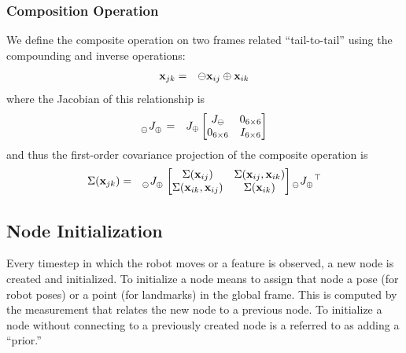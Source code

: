 \documentclass[conference]{IEEEtran}
\begin{document}
\subsubsection{Composition Operation}
\label{sub:compositionoperation}
We define the composite operation on two frames related
``tail-to-tail'' using the compounding and inverse operations:
\begin{eqnarray*}
  {\bf x}_{jk} & = & \ominus {\bf x}_{ij} \oplus {\bf x}_{ik}
\end{eqnarray*}
where the Jacobian of this relationship is 
\begin{eqnarray*}
  \tensor[_\ominus]{J}{_\oplus} & = & J_\oplus \begin{bmatrix}
    J_\ominus & 0_{6 \times 6}\\
    0_{6 \times 6} & I_{6 \times 6}\\
  \end{bmatrix}
\end{eqnarray*}
and thus the first-order covariance projection of the composite
operation is
\begin{eqnarray*}
  \Sigma({\bf x}_{jk}) & = & \tensor[_\ominus]{J}{_\oplus} \begin{bmatrix}
    \Sigma({\bf x}_{ij}) & \Sigma({\bf x}_{ij}, {\bf x}_{ik})\\
    \Sigma({\bf x}_{ik}, {\bf x}_{ij}) & \Sigma({\bf x}_{ik})\\
  \end{bmatrix} \tensor[_\ominus]{J}{_\oplus^\top}
\end{eqnarray*}



\subsection{Node Initialization}
\label{sub:nodeinitializationandedgeresiduals}
Every timestep in which the robot moves or a feature is observed, a new node is created
and initialized.  To initialize a node means to assign that node a pose (for robot poses)
or a point (for landmarks) in the global frame.  This is computed by the measurement
that relates the new node to a previous node.  To initialize a node without connecting to
a previously created node is a referred to as adding a ``prior.''
\end{document}
